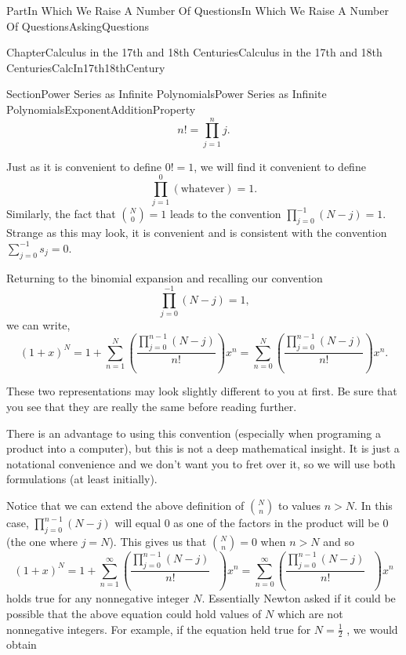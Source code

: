 \documentclass[oneside,10pt,]{book}
\numberwithin{equation}{part}
\begin{document}
\begin{partptx}{Part}{In Which We Raise A Number Of Questions}{}{In Which We Raise A Number Of Questions}{}{}{AskingQuestions}
\begin{chapterptx}{Chapter}{Calculus in the 17th and 18th Centuries}{}{Calculus in the 17th and 18th Centuries}{}{}{CalcIn17th18thCentury}
\begin{sectionptx}{Section}{Power Series as Infinite Polynomials}{}{Power Series as Infinite Polynomials}{}{}{ExponentAdditionProperty}
\begin{equation*}
n!=\prod_{j=1}^{n}j\text{.}
\end{equation*}
%
\par
Just as it is convenient to define \(0!=1\), we will find it convenient to define%
\begin{equation*}
\prod_{j=1}^{0}\left(\text{whatever}\right)=1\text{.}
\end{equation*}
Similarly, the fact that \(\binom{N}{0}=1\) leads to the convention \(\prod_{j=0}^{-1}\left(N-j\right)=1\). Strange as this may look, it is convenient and is consistent with the convention \(\sum_{j=0}^{-1}s_j=0\).%
\par
Returning to the binomial expansion and recalling our convention%
\begin{equation*}
\prod_{j=0}^{-1}\left(N-j\right)=1\text{,}
\end{equation*}
we can write,%
\begin{equation*}
\left(1+x\right)^N=1+\sum_{n=1}^N\left(\frac{\prod_{j=0}^{n-1}\left(N-j\right)}{n!}\right)x^n = \sum_{n=0}^N\left(\frac{\prod_{j=0}^{n-1}\left(N-j\right)}{n!}\right)x^n\text{.}
\end{equation*}
%
\par
These two representations may  look slightly different to you at first. Be sure that you see that they are really the same before reading further.%
\par
There is an advantage to using this convention (especially when programing a product into a computer), but this is not a deep mathematical insight.  It is just a notational convenience and we don't want you to fret over it, so we will use both formulations (at least initially).%
\par
Notice that we can extend the above definition of \(\binom{N}{n}\) to values \(n>N\).  In this case, \(\prod_{j=0}^{n-1}\left(N-j\right)\) will equal 0 as one of the factors in the product will be \(0\) (the one where \(j=N\)).  This gives us that \(\binom{N}{n}=0\) when \(n>N\) and so%
\begin{equation*}
\left(1+x\right)^N=1+\sum_{n=1}^\infty\left(\frac{\prod_{j=0}^{n-1}\left(N-j\right)}{n!}\text{ } \right)x^n= \sum_{n=0}^\infty\left(\frac{\prod_{j=0}^{n-1}\left(N-j\right)}{n!}\text{ } \right)x^n
\end{equation*}
holds true for any nonnegative integer \(N\). Essentially Newton asked if it could be possible that the above equation could hold values of \(N\) which are not nonnegative integers.  For example, if the equation held true for \(N=\frac{1}{2}\) , we would obtain%
\begin{equation*}

\end{equation*}
\end{sectionptx}
\end{chapterptx}
\end{partptx}
\end{document}
